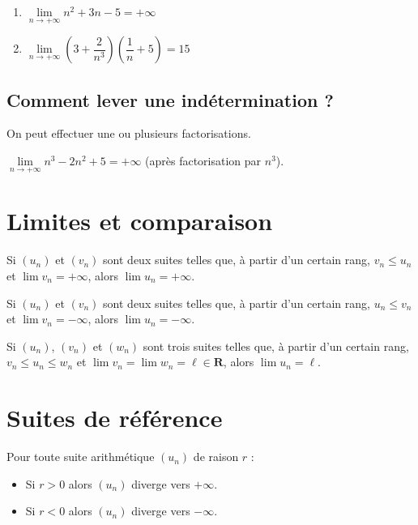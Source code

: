 \documentclass[11pt,a4paper,openany]{book}
\theoremstyle{definition}
\begin{document}
    \begin{Exemple}
    \begin{enumerate}
        \item $\lim\limits_{n\to+\infty} n^2+3n-5=+\infty$
        \item $\lim\limits_{n\to+\infty} \left(3+\dfrac{2}{n^3}\right)\left(\dfrac{1}{n}+5\right)=15$
    \end{enumerate}
    \end{Exemple}

    \subsection{Comment lever une indétermination ?}
    On peut effectuer une ou plusieurs factorisations.
    \begin{Exemple}
    $\lim\limits_{n\to+\infty} n^3-2n^2+5=+\infty$ (après factorisation par $n^3$).
    \end{Exemple}

    \section{Limites et comparaison}
    \begin{Propriété}
    Si $(u_n)$ et $(v_n)$ sont deux suites telles que, à partir d'un certain rang,
    $v_n\leq u_n$ et $\lim v_n=+\infty$, alors $\lim u_n=+\infty$.
    \end{Propriété}

    \begin{Propriété}
    Si $(u_n)$ et $(v_n)$ sont deux suites telles que, à partir d'un certain rang,
    $u_n\leq v_n$ et $\lim v_n=-\infty$, alors $\lim u_n=-\infty$.
    \end{Propriété}

    \begin{Théorème}
    Si $(u_n)$, $(v_n)$ et $(w_n)$ sont trois suites telles que, à partir d'un certain rang,
    $v_n\leq u_n\leq w_n$ et $\lim v_n=\lim w_n=\ell\in\mathbf{R}$, alors $\lim u_n=\ell$.
    \end{Théorème}

    \section{Suites de référence}
    \begin{Propriété}
    Pour toute suite arithmétique $(u_n)$ de raison $r$ :
    \begin{itemize}
        \item Si $r>0$ alors $(u_n)$ diverge vers $+\infty$.
        \item Si $r<0$ alors $(u_n)$ diverge vers $-\infty$.
    \end{itemize}
    \end{Propriété}
\end{document}
